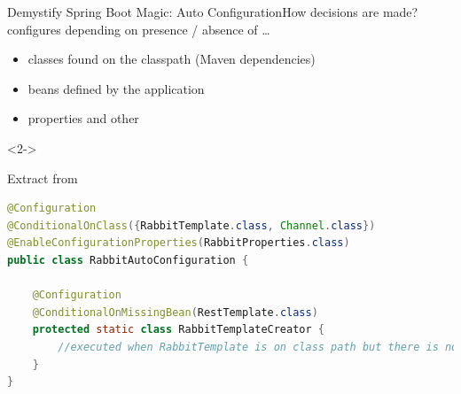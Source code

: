 \begin{frame}[t,fragile]{Demystify Spring Boot Magic: Auto Configuration}{How decisions are made?}
\small
\textbf{} configures  depending on presence / absence of \ldots
\begin{itemize}
	\item classes found on the classpath (Maven dependencies)
	\item beans defined by the application
	\item properties and other 
\end{itemize}
\begin{visibleenv}<2->
\begin{block}{Extract from }
\begin{lstlisting}[language=java,belowskip=-4mm,aboveskip=-1mm]
@Configuration
@ConditionalOnClass({RabbitTemplate.class, Channel.class})
@EnableConfigurationProperties(RabbitProperties.class)
public class RabbitAutoConfiguration {

    @Configuration
    @ConditionalOnMissingBean(RestTemplate.class)
    protected static class RabbitTemplateCreator {
        //executed when RabbitTemplate is on class path but there is no Bean
    }
}
\end{lstlisting}
\end{block}
\end{visibleenv}
\end{frame}

